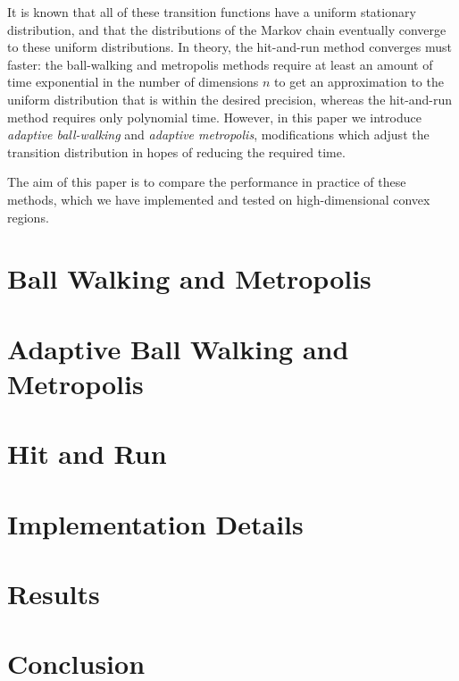 \documentclass[11pt]{article}
\begin{document}
It is known that all of these transition functions have a uniform stationary distribution, and that the distributions of the Markov chain eventually converge to these uniform distributions. In theory, the hit-and-run method converges must faster: the ball-walking and metropolis methods require at least an amount of time exponential in the number of dimensions $n$ to get an approximation to the uniform distribution that is within the desired precision, whereas the hit-and-run method requires only polynomial time. However, in this paper we introduce \emph{adaptive ball-walking} and \emph{adaptive metropolis}, modifications which adjust the transition distribution in hopes of reducing the required time.

The aim of this paper is to compare the performance in practice of these methods, which we have implemented and tested on high-dimensional convex regions.

\section{Ball Walking and Metropolis}

\section{Adaptive Ball Walking and Metropolis}

\section{Hit and Run}

\section{Implementation Details}

\section{Results}

\section{Conclusion}

\pagebreak
\end{document}
